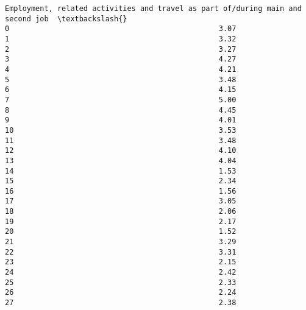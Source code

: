 \documentclass[11pt]{article}
\begin{document}
\begin{Verbatim}[commandchars=\\\{\}]
    Employment, related activities and travel as part of/during main and second job  \textbackslash{}
0                                                3.07                                 
1                                                3.32                                 
2                                                3.27                                 
3                                                4.27                                 
4                                                4.21                                 
5                                                3.48                                 
6                                                4.15                                 
7                                                5.00                                 
8                                                4.45                                 
9                                                4.01                                 
10                                               3.53                                 
11                                               3.48                                 
12                                               4.10                                 
13                                               4.04                                 
14                                               1.53                                 
15                                               2.34                                 
16                                               1.56                                 
17                                               3.05                                 
18                                               2.06                                 
19                                               2.17                                 
20                                               1.52                                 
21                                               3.29                                 
22                                               3.31                                 
23                                               2.15                                 
24                                               2.42                                 
25                                               2.33                                 
26                                               2.24                                 
27                                               2.38                                 


\end{Verbatim}
\end{document}

